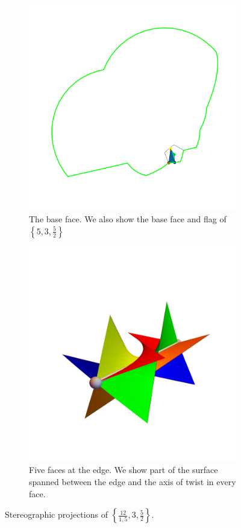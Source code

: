 \documentclass{article}
\theoremstyle{definition}
\begin{document}
\begin{figure}[H]
	\begin{center}
		\begin{subfigure}{\linewidth}
			\centering
			\includegraphics[width=0.7\linewidth]{fig13a}
			\caption{The base face. We also show the base face and flag of $\left\{5,3,\frac{5}{2}\right\}$}\label{fig:13a}
		\end{subfigure}
		\begin{subfigure}{\linewidth}
			\centering
			\includegraphics[width=0.5\linewidth]{fig12b}
			\caption{Five faces at the edge. We show part of the surface spanned between the edge and the axis of twist in every face.}\label{fig:13b}
		\end{subfigure}
	\end{center}
	\caption{Stereographic projections of  $\left\{\frac{12}{1,5},3,\frac{5}{2}\right\}$.}\label{fig:13}
\end{figure}
\end{document}
